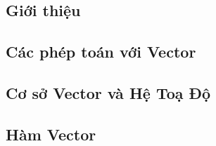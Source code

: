 \subsection{Giới thiệu}
\subsection{Các phép toán với Vector}
\subsection{Cơ sở Vector và Hệ Toạ Độ}
\subsection{Hàm Vector}
